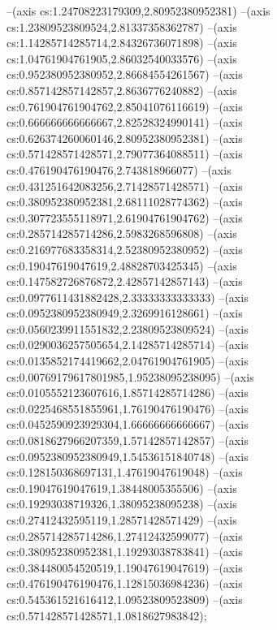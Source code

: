 --(axis cs:1.24708223179309,2.80952380952381)
--(axis cs:1.23809523809524,2.81337358362787)
--(axis cs:1.14285714285714,2.84326736071898)
--(axis cs:1.04761904761905,2.86032540033576)
--(axis cs:0.952380952380952,2.86684554261567)
--(axis cs:0.857142857142857,2.8636776240882)
--(axis cs:0.761904761904762,2.85041076116619)
--(axis cs:0.666666666666667,2.82528324990141)
--(axis cs:0.626374260060146,2.80952380952381)
--(axis cs:0.571428571428571,2.79077364088511)
--(axis cs:0.476190476190476,2.743818966077)
--(axis cs:0.431251642083256,2.71428571428571)
--(axis cs:0.380952380952381,2.68111028774362)
--(axis cs:0.307723555118971,2.61904761904762)
--(axis cs:0.285714285714286,2.5983268596808)
--(axis cs:0.216977683358314,2.52380952380952)
--(axis cs:0.19047619047619,2.48828703425345)
--(axis cs:0.147582726876872,2.42857142857143)
--(axis cs:0.0977611431882428,2.33333333333333)
--(axis cs:0.0952380952380949,2.3269916128661)
--(axis cs:0.0560239911551832,2.23809523809524)
--(axis cs:0.0290036257505654,2.14285714285714)
--(axis cs:0.0135852174419662,2.04761904761905)
--(axis cs:0.00769179617801985,1.95238095238095)
--(axis cs:0.0105552123607616,1.85714285714286)
--(axis cs:0.0225468551855961,1.76190476190476)
--(axis cs:0.0452590923929304,1.66666666666667)
--(axis cs:0.0818627966207359,1.57142857142857)
--(axis cs:0.0952380952380949,1.54536151840748)
--(axis cs:0.128150368697131,1.47619047619048)
--(axis cs:0.19047619047619,1.38448005355506)
--(axis cs:0.19293038719326,1.38095238095238)
--(axis cs:0.27412432595119,1.28571428571429)
--(axis cs:0.285714285714286,1.27412432599077)
--(axis cs:0.380952380952381,1.19293038783841)
--(axis cs:0.384480054520519,1.19047619047619)
--(axis cs:0.476190476190476,1.12815036984236)
--(axis cs:0.545361521616412,1.09523809523809)
--(axis cs:0.571428571428571,1.0818627983842);

